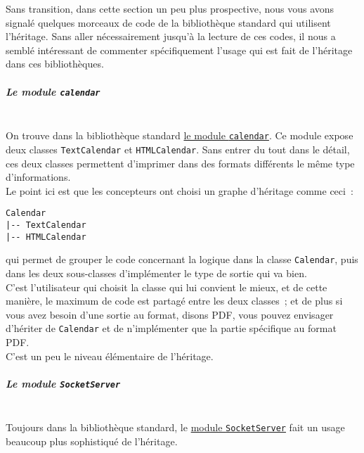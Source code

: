     Sans transition, dans cette section un peu plus prospective, nous vous
avons signalé quelques morceaux de code de la bibliothèque standard qui
utilisent l'héritage. Sans aller nécessairement jusqu'à la lecture de
ces codes, il nous a semblé intéressant de commenter spécifiquement
l'usage qui est fait de l'héritage dans ces bibliothèques.

    \hypertarget{le-module-calendar}{%
\subparagraph{\texorpdfstring{Le module
\texttt{calendar}\\\\}{Le module calendar}}\label{le-module-calendar}}

    On trouve dans la bibliothèque standard
\href{https://docs.python.org/3/library/calendar.html}{le module
\texttt{calendar}}. Ce module expose deux classes \texttt{TextCalendar}
et \texttt{HTMLCalendar}. Sans entrer du tout dans le détail, ces deux
classes permettent d'imprimer dans des formats différents le même type
d'informations.\\

Le point ici est que les concepteurs ont choisi un graphe d'héritage
comme ceci~:

\begin{verbatim}
Calendar
|-- TextCalendar
|-- HTMLCalendar
\end{verbatim}

qui permet de grouper le code concernant la logique dans la classe
\texttt{Calendar}, puis dans les deux sous-classes d'implémenter le type
de sortie qui va bien.\\

C'est l'utilisateur qui choisit la classe qui lui convient le mieux, et
de cette manière, le maximum de code est partagé entre les deux
classes~; et de plus si vous avez besoin d'une sortie au format, disons
PDF, vous pouvez envisager d'hériter de \texttt{Calendar} et de
n'implémenter que la partie spécifique au format PDF.\\

C'est un peu le niveau élémentaire de l'héritage.

    \hypertarget{le-module-socketserver}{%
\subparagraph{\texorpdfstring{Le module
\texttt{SocketServer}\\\\}{Le module SocketServer}}\label{le-module-socketserver}}

    Toujours dans la bibliothèque standard, le
\href{https://docs.python.org/3/library/socketserver.html}{module
\texttt{SocketServer}} fait un usage beaucoup plus sophistiqué de
l'héritage.\\

